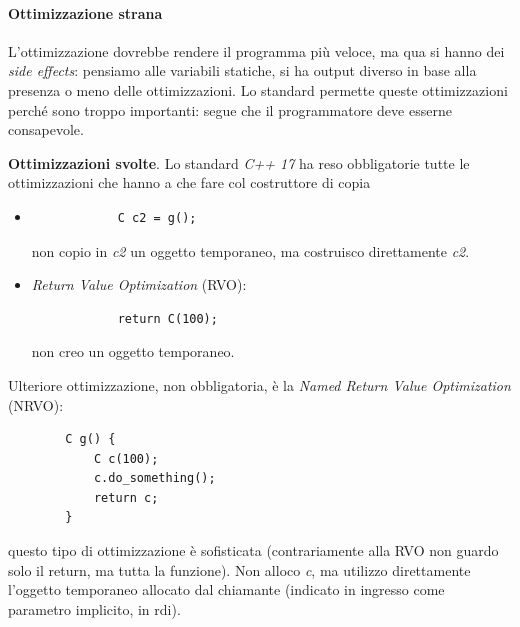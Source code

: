 \paragraph{Ottimizzazione strana}  L'ottimizzazione dovrebbe rendere il programma più veloce, ma qua si hanno dei \emph{side effects}: pensiamo alle variabili statiche, si ha output diverso in base alla presenza o meno delle ottimizzazioni. Lo standard permette queste ottimizzazioni perché sono troppo importanti: segue che il programmatore deve esserne consapevole.
\begin{framed}\noindent \textbf{Ottimizzazioni svolte}. Lo standard \emph{C++ 17} ha reso obbligatorie tutte le ottimizzazioni che hanno a che fare col costruttore di copia
	\begin{itemize}
		\item \begin{verbatim}
			C c2 = g();
		\end{verbatim}
		non copio in \emph{c2} un oggetto temporaneo, ma costruisco direttamente \emph{c2}.
		\item \emph{Return Value Optimization} (RVO):
		\begin{verbatim}
			return C(100);
		\end{verbatim}
		non creo un oggetto temporaneo.
	\end{itemize}
	Ulteriore ottimizzazione, non obbligatoria, è la \emph{Named Return Value Optimization} (NRVO):
	\begin{verbatim}
		C g() {
			C c(100);
			c.do_something();
			return c;
		}
	\end{verbatim}
	questo tipo di ottimizzazione è sofisticata (contrariamente alla RVO non guardo solo il return, ma tutta la funzione). Non alloco \emph{c}, ma utilizzo direttamente l'oggetto temporaneo allocato dal chiamante (indicato in ingresso come parametro implicito, in rdi). 
\end{framed}
\clearpage 


